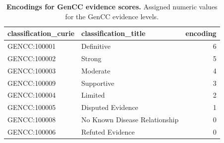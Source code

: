 \documentclass[
]{article}
\begin{document}
\begin{longtable}[]{@{}llr@{}}

\caption{\label{tbl-gencc}\textbf{Encodings for GenCC evidence scores.}
Assigned numeric values for the GenCC evidence levels.}

\tabularnewline

\toprule\noalign{}
classification\_curie & classification\_title & encoding \\
\midrule\noalign{}
\endhead
\bottomrule\noalign{}
\endlastfoot
GENCC:100001 & Definitive & 6 \\
GENCC:100002 & Strong & 5 \\
GENCC:100003 & Moderate & 4 \\
GENCC:100009 & Supportive & 3 \\
GENCC:100004 & Limited & 2 \\
GENCC:100005 & Disputed Evidence & 1 \\
GENCC:100008 & No Known Disease Relationship & 0 \\
GENCC:100006 & Refuted Evidence & 0 \\

\end{longtable}

\newpage
\end{document}
